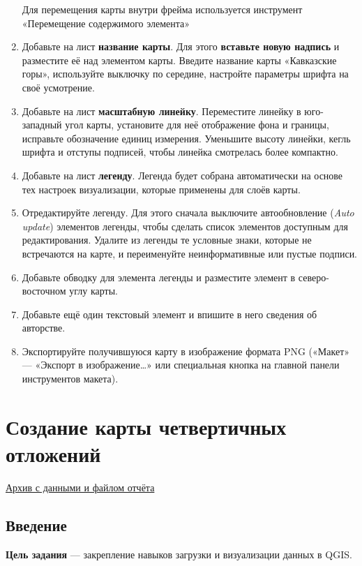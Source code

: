 \documentclass[
  12pt,
]{book}
\begin{document}
\begin{enumerate}
  Для перемещения карты внутри фрейма используется инструмент «Перемещение содержимого элемента»
\item
  Добавьте на лист \textbf{название карты}. Для этого \textbf{вставьте новую надпись} и разместите её над элементом карты. Введите название карты «Кавказские горы», используйте выключку по середине, настройте параметры шрифта на своё усмотрение.
\item
  Добавьте на лист \textbf{масштабную линейку}. Переместите линейку в юго-западный угол карты, установите для неё отображение фона и границы, исправьте обозначение единиц измерения. Уменьшите высоту линейки, кегль шрифта и отступы подписей, чтобы линейка смотрелась более компактно.
\item
  Добавьте на лист \textbf{легенду}. Легенда будет собрана автоматически на основе тех настроек визуализации, которые применены для слоёв карты.
\item
  Отредактируйте легенду. Для этого сначала выключите автообновление (\emph{Auto update}) элементов легенды, чтобы сделать список элементов доступным для редактирования. Удалите из легенды те условные знаки, которые не встречаются на карте, и переименуйте неинформативные или пустые подписи.
\item
  Добавьте обводку для элемента легенды и разместите элемент в северо-восточном углу карты.
\item
  Добавьте ещё один текстовый элемент и впишите в него сведения об авторстве.
\item
  Экспортируйте получившуюся карту в изображение формата PNG («Макет» --- «Экспорт в изображение\ldots» или специальная кнопка на главной панели инструментов макета).
\end{enumerate}

\hypertarget{map-design-quaternary}{%
\chapter{Создание карты четвертичных отложений}\label{map-design-quaternary}}

\href{https://1drv.ms/u/s!AmtmZDq3JgxHgZUFCgDwGfEvocDIrw?e=LZbP6h}{Архив с данными и файлом отчёта}

\hypertarget{map-design-quaternary-intro}{%
\section{Введение}\label{map-design-quaternary-intro}}

\textbf{Цель задания} --- закрепление навыков загрузки и визуализации данных в QGIS.
\end{document}
